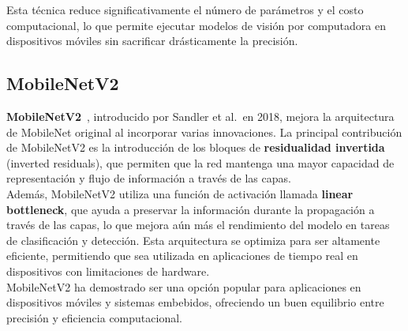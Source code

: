Esta técnica reduce significativamente el número de parámetros y el costo computacional, lo que permite ejecutar
modelos de visión por computadora en dispositivos móviles sin sacrificar drásticamente la precisión.

\subsection{MobileNetV2}\label{subsec:mobilenetv2}
\textbf{MobileNetV2}~\cite{}, introducido por Sandler et al.\ en 2018, mejora la arquitectura de MobileNet original al
incorporar varias innovaciones.
La principal contribución de MobileNetV2 es la introducción de los bloques de \textbf{residualidad invertida} (inverted
residuals), que permiten que la red mantenga una mayor capacidad de representación y flujo de información a través de
las capas. \\[6pt]

Además, MobileNetV2 utiliza una función de activación llamada \textbf{linear bottleneck}, que ayuda a preservar la
información durante la propagación a través de las capas, lo que mejora aún más el rendimiento del modelo en tareas de
clasificación y detección.
Esta arquitectura se optimiza para ser altamente eficiente, permitiendo que sea utilizada en aplicaciones de tiempo
real en dispositivos con limitaciones de hardware. \\[6pt]

MobileNetV2 ha demostrado ser una opción popular para aplicaciones en dispositivos móviles y sistemas embebidos,
ofreciendo un buen equilibrio entre precisión y eficiencia computacional.
